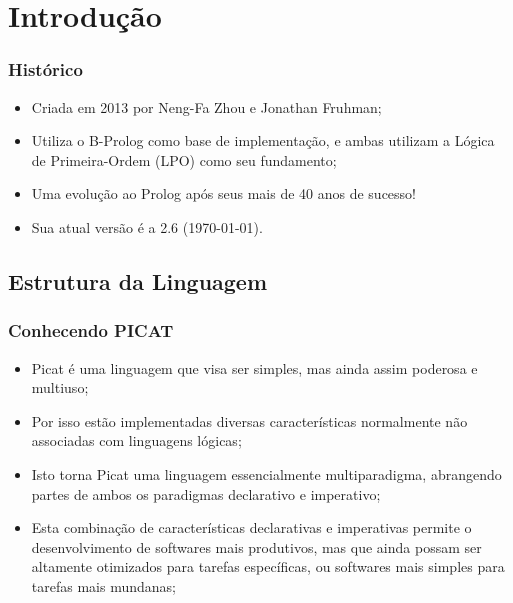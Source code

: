 \section{Introdução}
\begin{frame}

    \frametitle{Histórico}

    \begin{itemize}
      \item Criada em 2013 por Neng-Fa Zhou e Jonathan Fruhman; 

      \item Utiliza o B-Prolog como base de implementação, e ambas utilizam 
      a Lógica de Primeira-Ordem (LPO) como seu fundamento;

      \item Uma evolução ao Prolog após seus mais de 40 anos de sucesso!

      \item Sua atual versão é a 2.6 (\today).

    \end{itemize}
\end{frame}


\subsection{Estrutura da Linguagem}

\begin{frame}
	\frametitle{Conhecendo PICAT}
    
    \begin{itemize}
    
    	\item Picat é uma linguagem que visa ser simples, mas ainda assim
        poderosa e multiuso;
        
        \item Por isso estão implementadas diversas características 
        normalmente não associadas com linguagens lógicas;
        
        \item Isto torna Picat uma linguagem essencialmente multiparadigma,
        abrangendo partes de ambos os paradigmas declarativo e imperativo;
        
        \item Esta combinação de características declarativas e imperativas permite
        o desenvolvimento de softwares mais produtivos, mas que ainda possam ser altamente 
        otimizados para tarefas específicas, ou softwares mais simples para tarefas mais mundanas;
        
    \end{itemize}
    
\end{frame}

